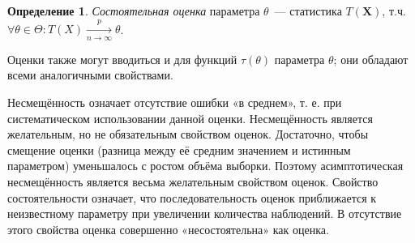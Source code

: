 \documentclass[oneside,final,14pt]{extreport}
\theoremstyle{plain}
\theoremstyle{definition}
\newtheorem*{defn}{Определение}
\theoremstyle{named}
\begin{document}
\begin{defn}
{\it Состоятельная оценка} параметра $\theta$~--- статистика $T(\mathbf{X})$, т.ч. $\forall \theta \in \Theta: T(X) \xrightarrow[n \rightarrow \infty]{p} \theta$.
\end{defn}

Оценки также могут вводиться и для функций $\tau(\theta)$ параметра $\theta$; они обладают всеми аналогичными свойствами.

Несмещённость означает отсутствие ошибки «в среднем», т. е. при систематическом использовании данной оценки. Несмещённость является желательным, но не обязательным свойством оценок. Достаточно, чтобы смещение оценки (разница между её средним значением и истинным параметром) уменьшалось с ростом объёма выборки. Поэтому асимптотическая несмещённость является весьма желательным свойством оценок. Свойство состоятельности означает, что последовательность оценок приближается к неизвестному параметру при увеличении количества наблюдений. В отсутствие этого свойства оценка совершенно «несостоятельна» как оценка.
\end{document}

